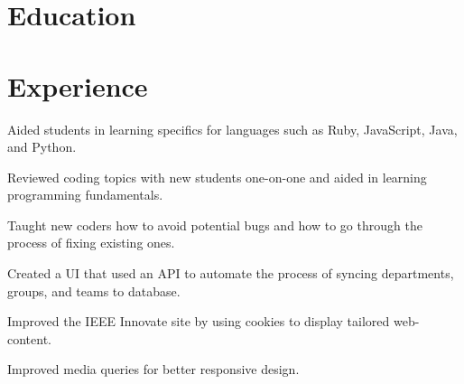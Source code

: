 \documentclass[]{deedy-resume-openfont}
\begin{document}
%
%




\section{Education}

\vspace{1mm}

\sectionsep

\vspace{1mm}


\section{Experience}

\vspace{1mm}

\vspace{1mm}
\begin{tightemize} \itemsep 7pt
\item Aided students in learning specifics for languages such as Ruby, JavaScript, Java, and Python.
\item Reviewed coding topics with new students one-on-one and aided in learning programming fundamentals.
\item Taught new coders how to avoid potential bugs and how to go through the process of fixing existing ones.
\end{tightemize}
\sectionsep

\vspace{1mm}
\begin{tightemize} \itemsep 7pt
\item Created a UI that used an API to automate the process of syncing departments, groups, and teams to database.
\item Improved the IEEE Innovate site by using cookies to display tailored web-content.
\item Improved media queries for better responsive design.

\end{tightemize}
\sectionsep
\end{document}
